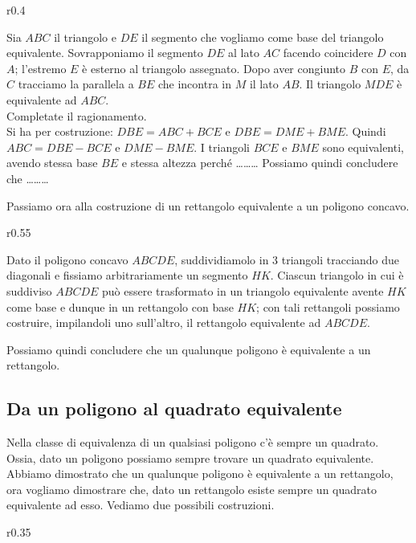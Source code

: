 \begin{wrapfigure}{r}{0.4\textwidth}
	\centering
\end{wrapfigure}
Sia $ABC$ il triangolo e $DE$ il segmento che vogliamo come base del triangolo equivalente.
Sovrapponiamo il segmento $DE$ al lato $AC$ facendo coincidere $D$ con $A$; l'estremo $E$ è esterno al triangolo assegnato. Dopo aver congiunto $B$ con $E$, da $C$ tracciamo la parallela a $BE$ che incontra in $M$ il lato $AB$. Il triangolo $MDE$ è equivalente ad $ABC$.\\
Completate il ragionamento.\\
Si ha per costruzione: 
$DBE=ABC+BCE$ e $DBE=DME+BME$.
Quindi $ABC=DBE-BCE$ e $DME-BME$.
I triangoli $BCE$ e $BME$ sono equivalenti, avendo stessa base $BE$ e stessa altezza perché \ldots\ldots\ldots{}	Possiamo quindi concludere che \ldots\ldots\ldots{}

Passiamo ora alla costruzione di un rettangolo equivalente a un poligono concavo.

\begin{wrapfigure}{r}{0.55\textwidth}
	\centering
\end{wrapfigure}
Dato il poligono concavo $ABCDE$, suddividiamolo in 3 triangoli tracciando due diagonali e fissiamo arbitrariamente un segmento $HK$. Ciascun triangolo in cui è suddiviso $ABCDE$ può essere trasformato in un triangolo equivalente avente $HK$ come base e dunque in un rettangolo con base $HK$; con tali rettangoli possiamo costruire, impilandoli uno sull'altro, il rettangolo equivalente ad $ABCDE$.

Possiamo quindi concludere che un qualunque poligono è equivalente a un rettangolo.

\subsection{Da un poligono al quadrato equivalente}

Nella classe di equivalenza di un qualsiasi poligono c'è sempre un quadrato. Ossia, dato un poligono possiamo sempre trovare un quadrato equivalente.
Abbiamo dimostrato che un qualunque poligono è equivalente a un rettangolo, ora vogliamo dimostrare che, dato un rettangolo esiste sempre un quadrato equivalente ad esso.
Vediamo due possibili costruzioni.

\begin{wrapfigure}{r}{0.35\textwidth}
	\centering\vspace{6pt}\\
	\centering\vspace{6pt}\\
	\centering
\end{wrapfigure}
